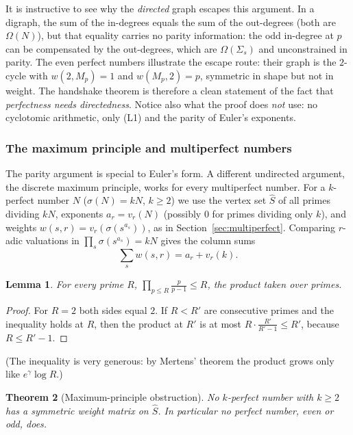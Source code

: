 \documentclass[11pt]{article}
\newtheorem{theorem}{Theorem}[section]
\newtheorem{lemma}[theorem]{Lemma}
\theoremstyle{definition}
\theoremstyle{remark}
\begin{document}
It is instructive to see why the \emph{directed} graph escapes this argument.
In a digraph, the sum of the in-degrees equals the sum of the out-degrees (both
are $\Omega(N)$), but that equality carries no parity information: the odd
in-degree at $p$ can be compensated by the out-degrees, which are
$\Omega(\Sigma_s)$ and unconstrained in parity.  The even perfect numbers
illustrate the escape route: their graph is the $2$-cycle with
$w(2,M_p)=1$ and $w(M_p,2)=p$, symmetric in shape but not in weight.  The
handshake theorem is therefore a clean statement of the fact that
\emph{perfectness needs directedness}.  Notice also what the proof does
\emph{not} use: no cyclotomic arithmetic, only (L1) and the parity of Euler's
exponents.

\subsubsection{The maximum principle and multiperfect numbers}

The parity argument is special to Euler's form.  A different undirected
argument, the discrete maximum principle, works for every multiperfect
number.  For a $k$-perfect number $N$ ($\sigma(N)=kN$, $k\ge2$) we use the
vertex set $\widehat S$ of all primes dividing $kN$, exponents
$a_r=v_r(N)$ (possibly $0$ for primes dividing only $k$), and weights
$w(s,r)=v_r(\sigma(s^{a_s}))$, as in Section~\ref{sec:multiperfect}.  Comparing
$r$-adic valuations in $\prod_s\sigma(s^{a_s})=kN$ gives the column sums
\[
\sum_s w(s,r)=a_r+v_r(k).
\]

\begin{lemma}\label{lem:mertens}
For every prime $R$,
$\displaystyle\prod_{p\le R}\frac{p}{p-1}\le R$, the product taken over
primes.
\end{lemma}

\begin{proof}
For $R=2$ both sides equal $2$.  If $R<R'$ are consecutive primes and the
inequality holds at $R$, then the product at $R'$ is at most
$R\cdot\frac{R'}{R'-1}\le R'$, because $R\le R'-1$.
\end{proof}

(The inequality is very generous: by Mertens' theorem the product grows only
like $e^\gamma\log R$.)

\begin{theorem}[Maximum-principle obstruction]\label{thm:maxprinciple}
No $k$-perfect number with $k\ge2$ has a symmetric weight matrix on
$\widehat S$.  In particular no perfect number, even or odd, does.
\end{theorem}
\end{document}
